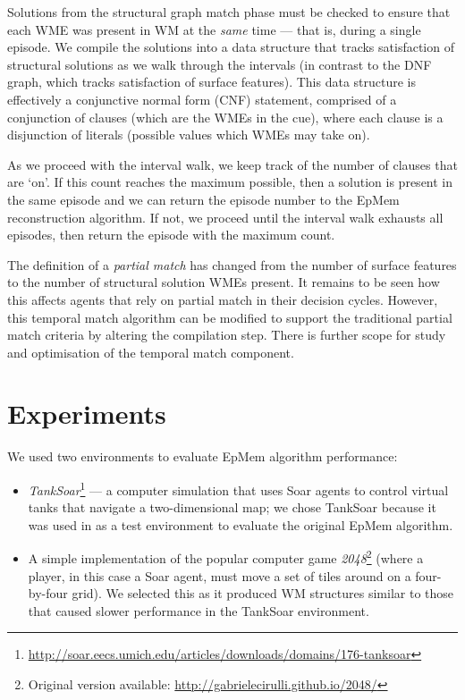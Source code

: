 \documentclass[envcountsame]{llncs}
\begin{document}
  Solutions from the structural graph match phase must be checked to ensure that each WME was present in WM at the \emph{same} time --- that is, during a single episode.
  We compile the solutions into a data structure that tracks satisfaction of structural solutions as we walk through the intervals (in contrast to the DNF graph, which tracks satisfaction of surface features).
  This data structure is effectively a conjunctive normal form (CNF) statement, comprised of a conjunction of clauses (which are the WMEs in the cue), where each clause is a disjunction of literals (possible values which WMEs may take on).

  As we proceed with the interval walk, we keep track of the number of clauses that are `on'.
  If this count reaches the maximum possible, then a solution is present in the same episode and we can return the episode number to the EpMem reconstruction algorithm.
  If not, we proceed until the interval walk exhausts all episodes, then return the episode with the maximum count.

  The definition of a \emph{partial match} has changed from the number of surface features to the number of structural solution WMEs present. It remains to be seen how this affects agents that rely on partial match in their decision cycles. However, this temporal match algorithm can be modified to support the traditional partial match criteria by altering the compilation step.
  There is further scope for study and optimisation of the temporal match component.

  
\section{Experiments}
  \label{sec:results}

  We used two environments to evaluate EpMem algorithm performance:
  \begin{itemize}
    \item \emph{TankSoar}\footnote{\url{http://soar.eecs.umich.edu/articles/downloads/domains/176-tanksoar}} --- a computer simulation
  that uses Soar agents to control virtual tanks that navigate a two-dimensional map; we chose TankSoar because it was used in \cite{derbinsky2012effective} as a test environment to evaluate the original EpMem algorithm.
    \item A simple implementation of the popular computer game \emph{2048}\footnote{Original version available: \url{http://gabrielecirulli.github.io/2048/}}  (where a player, in this case a Soar agent, must move a set of tiles around on a four-by-four grid).
    We selected this as it produced WM structures similar to those that caused slower performance in the TankSoar environment.
  \end{itemize}
\end{document}
